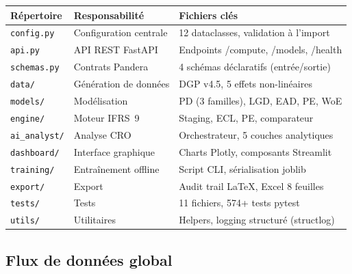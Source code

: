 \documentclass[12pt,a4paper]{article}
\begin{document}
\begin{center}
\begin{tabular}{lp{4cm}p{6cm}}
\toprule
\textbf{R\'epertoire} & \textbf{Responsabilit\'e} & \textbf{Fichiers cl\'es} \\
\midrule
\texttt{config.py} & Configuration centrale & 12 dataclasses, validation \`a l'import \\
\texttt{api.py} & API REST FastAPI & Endpoints /compute, /models, /health \\
\texttt{schemas.py} & Contrats Pandera & 4 sch\'emas d\'eclaratifs (entr\'ee/sortie) \\
\texttt{data/} & G\'en\'eration de donn\'ees & DGP v4.5, 5 effets non-lin\'eaires \\
\texttt{models/} & Mod\'elisation & PD (3 familles), LGD, EAD, PE, WoE \\
\texttt{engine/} & Moteur IFRS~9 & Staging, ECL, PE, comparateur \\
\texttt{ai\_analyst/} & Analyse CRO & Orchestrateur, 5 couches analytiques \\
\texttt{dashboard/} & Interface graphique & Charts Plotly, composants Streamlit \\
\texttt{training/} & Entra\^inement offline & Script CLI, s\'erialisation joblib \\
\texttt{export/} & Export & Audit trail \LaTeX, Excel 8 feuilles \\
\texttt{tests/} & Tests & 11 fichiers, 574+ tests pytest \\
\texttt{utils/} & Utilitaires & Helpers, logging structur\'e (structlog) \\
\bottomrule
\end{tabular}
\end{center}

\subsection{Flux de donn\'ees global}
\end{document}
